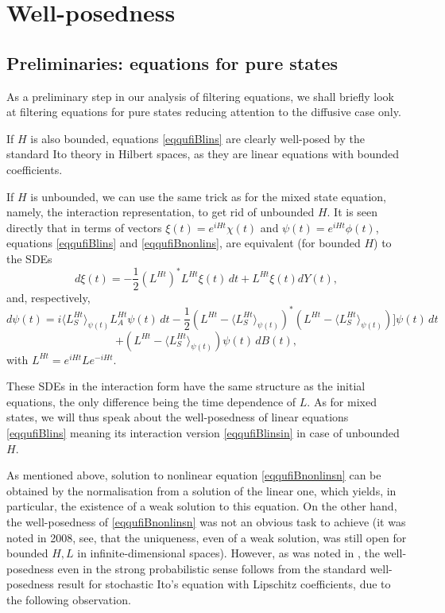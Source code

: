 \documentclass[10pt,a4paper]{amsart}
\begin{document}
\section{Well-posedness}
\label{secwellpos}

\subsection{Preliminaries: equations for pure states}

As a preliminary step in our analysis of filtering equations, we shall briefly look at
filtering equations for pure states reducing attention to the diffusive case only.

If $H$ is also bounded,
equations \eqref{eqqufiBlins} are clearly well-posed by the standard Ito theory
in Hilbert spaces, as they are
linear equations with bounded coefficients.

If $H$ is unbounded, we can use the same trick as for the mixed state equation,
namely, the interaction representation, to get rid of unbounded $H$.
It is seen directly that in terms of vectors
$\xi(t)=e^{iHt} \chi(t)$ and $\psi(t)=e^{iHt} \phi(t)$,
equations \eqref{eqqufiBlins} and \eqref{eqqufiBnonlins},
are equivalent (for bounded $H$) to the SDEs
\begin{equation}
\label{eqqufiBlinsin}
d\xi(t) = -\frac12 (L^{Ht})^*L^{Ht} \xi(t) \,dt+L^{Ht} \xi(t) dY(t),
\end{equation}
and, respectively,
\[
d\psi(t)= i\langle L^{Ht}_S \rangle_{\psi(t)} L^{Ht}_A \psi(t) \, dt
-\frac12 (L^{Ht}-\langle L^{Ht}_S \rangle_{\psi(t)})^*(L^{Ht}-\langle L^{Ht}_S \rangle_{\psi(t)})]\psi(t) \, dt
\]
\begin{equation}
\label{eqqufiBnonlinsin}
+ (L^{Ht}-\langle L^{Ht}_S \rangle_{\psi(t)})\psi(t) \, dB(t),
\end{equation}
with $L^{Ht}=e^{iHt} L e^{-iHt}$.

These SDEs in the interaction form have the same structure as the initial equations, the only difference being
the time dependence of $L$. As for mixed states,
we will thus speak about the well-posedness of linear equations \eqref{eqqufiBlins} meaning its interaction version
\eqref{eqqufiBlinsin} in case of unbounded $H$.

As mentioned above, solution to nonlinear equation  \eqref{eqqufiBnonlinsn} can be obtained by the normalisation
  from a solution of the linear one, which yields, in particular, the existence of a weak solution to this equation.
  On the other hand, the well-posedness of  \eqref{eqqufiBnonlinsn}  was not an obvious task to achieve
  (it was noted in 2008, see\cite{MoraRebo}, that the uniqueness, even of a weak solution,
was still open for bounded $H,L$ in infinite-dimensional spaces). However, as was noted in \cite{KolQuantLLN},
the  well-posedness even in the strong probabilistic sense follows from the standard well-posedness result
  for stochastic Ito's equation with Lipschitz coefficients, due to
  the following observation.
\end{document}
